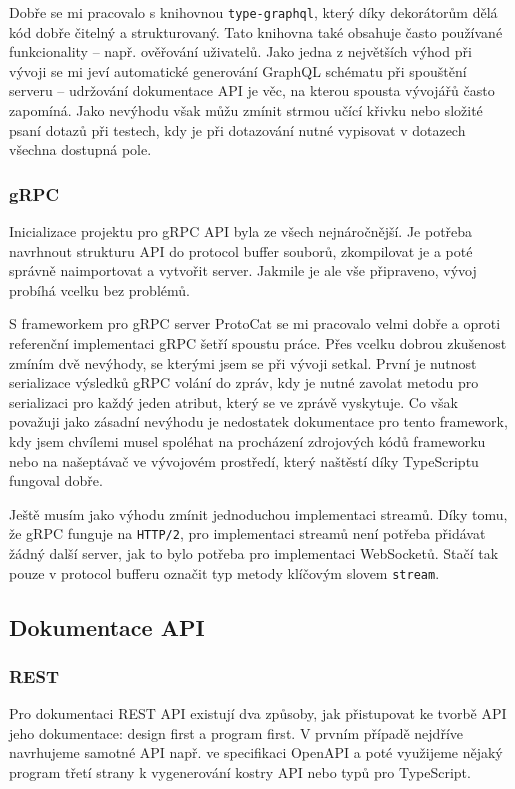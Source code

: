 \documentclass[thesis=M,czech]{FITthesis}[2019/12/23]
\begin{document}
Dobře se mi pracovalo s knihovnou \texttt{type-graphql}\cite{typegraphql_doc}, který díky dekorátorům dělá kód dobře čitelný a strukturovaný. Tato knihovna také obsahuje často používané funkcionality -- např. ověřování uživatelů. Jako jedna z největších výhod při vývoji se mi jeví automatické generování GraphQL schématu při spouštění serveru -- udržování dokumentace API je věc, na kterou spousta vývojářů často zapomíná. Jako nevýhodu však můžu zmínit strmou učící křivku nebo složité psaní dotazů při testech, kdy je při dotazování nutné vypisovat v dotazech všechna dostupná pole.

\subsubsection*{gRPC}
Inicializace projektu pro gRPC API byla ze všech nejnáročnější. Je potřeba navrhnout strukturu API do protocol buffer souborů, zkompilovat je a poté správně naimportovat a vytvořit server. Jakmile je ale vše připraveno, vývoj probíhá vcelku bez problémů.

S frameworkem pro gRPC server ProtoCat se mi pracovalo velmi dobře a oproti referenční implementaci gRPC šetří spoustu práce. Přes vcelku dobrou zkušenost zmíním dvě nevýhody, se kterými jsem se při vývoji setkal. První je nutnost serializace výsledků gRPC volání do zpráv, kdy je nutné zavolat metodu pro serializaci pro každý jeden atribut, který se ve zprávě vyskytuje. Co však považuji jako zásadní nevýhodu je nedostatek dokumentace pro tento framework, kdy jsem chvílemi musel spoléhat na procházení zdrojových kódů frameworku nebo na našeptávač ve vývojovém prostředí, který naštěstí díky TypeScriptu fungoval dobře.

Ještě musím jako výhodu zmínit jednoduchou implementaci streamů. Díky tomu, že gRPC funguje na \texttt{HTTP/2}, pro implementaci streamů není potřeba přidávat žádný další server, jak to bylo potřeba pro implementaci WebSocketů. Stačí tak pouze v protocol bufferu označit typ metody klíčovým slovem \texttt{stream}.


\subsection{Dokumentace API}
\subsubsection*{REST}
Pro dokumentaci REST API existují dva způsoby, jak přistupovat ke tvorbě API jeho dokumentace: design first a program first.%
V prvním případě nejdříve navrhujeme samotné API např. ve specifikaci OpenAPI a poté využijeme nějaký program třetí strany k vygenerování kostry API nebo typů pro TypeScript.
\end{document}

